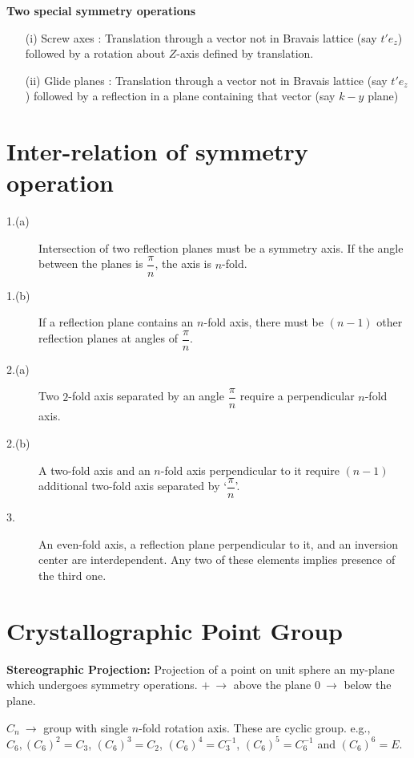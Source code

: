 \noindent
{\bf Two special symmetry operations}
\begin{itemize}
\item[(i)] Screw axes : Translation through a vector not in Bravais lattice (say $t'e_{z}$) followed by a rotation about $Z$-axis defined by translation.

\item[(ii)] Glide planes : Translation through a vector not in Bravais lattice (say $t'e_{z}$) followed by a reflection in a plane containing that vector (say $k-y$ plane)
\end{itemize}

\section*{Inter-relation of symmetry operation}
\begin{description}
\item[1.(a)] Intersection of two reflection planes must be a symmetry axis. If the angle between the planes is $\dfrac{\pi}{n}$, the axis is $n$-fold.

\item[1.(b)] If a reflection plane contains an $n$-fold axis, there must be $(n-1)$ other reflection planes at angles of $\dfrac{\pi}{n}$.

\item[2.(a)] Two $2$-fold axis separated by an angle $\dfrac{\pi}{n}$ require a perpendicular $n$-fold axis.

\item[2.(b)] A two-fold axis and an $n$-fold axis perpendicular to it require $(n-1)$ additional two-fold axis separated by `$\dfrac{\pi}{n}$'.

\item[3.] An even-fold axis, a reflection plane perpendicular to it, and an inversion center are interdependent. Any two of these elements implies presence of the third one.
\end{description}

\section*{Crystallographic Point Group}

\noindent
{\bf Stereographic Projection:} Projection of a point on unit sphere an my-plane which undergoes symmetry operations. $+ \ \to$ above the plane $0 \ \to$ below the plane.

$C_{n} \ \to$ group with single $n$-fold rotation axis. These are cyclic group. e.g., $C_{6},(C_{6})^{2}=C_{3}$, $(C_{6})^{3}=C_{2}$, $(C_{6})^{4}=C^{-1}_{3}$, $(C_{6})^{5}=C^{-1}_{6}$ and $(C_{6})^{6}=E$.

